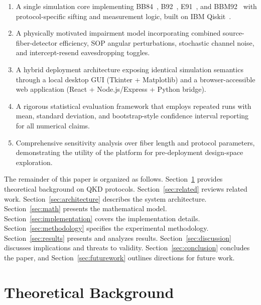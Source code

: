 \documentclass[journal]{IEEEtran}
\begin{document}
\begin{enumerate}
  \item A single simulation core implementing BB84~\cite{bb84},
        B92~\cite{b92}, E91~\cite{e91}, and BBM92~\cite{bbm92} with
        protocol-specific sifting and measurement logic, built on
        IBM Qiskit~\cite{qiskit}.

  \item A physically motivated impairment model incorporating combined
        source-fiber-detector efficiency, SOP angular perturbations,
        stochastic channel noise, and intercept-resend eavesdropping
        toggles.

  \item A hybrid deployment architecture exposing identical simulation
        semantics through a local desktop GUI (Tkinter + Matplotlib) and
        a browser-accessible web application (React + Node.js/Express +
        Python bridge).

  \item A rigorous statistical evaluation framework that employs
        repeated runs with mean, standard deviation, and bootstrap-style
        confidence interval reporting for all numerical claims.

  \item Comprehensive sensitivity analysis over fiber length and
        protocol parameters, demonstrating the utility of the platform
        for pre-deployment design-space exploration.
\end{enumerate}

The remainder of this paper is organized as follows.
Section~\ref{sec:background} provides theoretical background on QKD
protocols. Section~\ref{sec:related} reviews related work.
Section~\ref{sec:architecture} describes the system architecture.
Section~\ref{sec:math} presents the mathematical model.
Section~\ref{sec:implementation} covers the implementation details.
Section~\ref{sec:methodology} specifies the experimental methodology.
Section~\ref{sec:results} presents and analyzes results.
Section~\ref{sec:discussion} discusses implications and threats to
validity. Section~\ref{sec:conclusion} concludes the paper, and
Section~\ref{sec:futurework} outlines directions for future work.

\section{Theoretical Background}
\label{sec:background}
\end{document}
